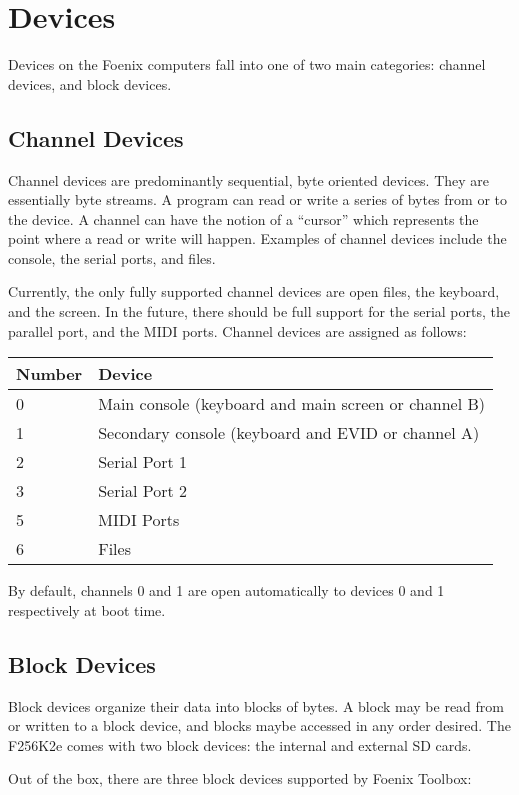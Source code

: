 \chapter{Devices}
Devices on the Foenix computers fall into one of two main categories: channel devices, and block devices.

\section*{Channel Devices}
Channel devices are predominantly sequential, byte oriented devices. They are essentially byte streams. A program can read or write a series of bytes from or to the device. A channel can have the notion of a ``cursor'' which represents the point where a read or write will happen. Examples of channel devices include the console, the serial ports, and files.

Currently, the only fully supported channel devices are open files, the keyboard, and the screen. In the future, there should be full support for the serial ports, the parallel port, and the MIDI ports. Channel devices are assigned as follows:

\begin{tabular}{|l||l|} \hline
	Number & Device \\ \hline\hline
	0 & Main console (keyboard and main screen or channel B) \\ \hline
	1 & Secondary console (keyboard and EVID or channel A) \\ \hline
	2 & Serial Port 1 \\ \hline
	3 & Serial Port 2 \\ \hline
	5 & MIDI Ports \\ \hline
	6 & Files \\ \hline
\end{tabular}

By default, channels 0 and 1 are open automatically to devices 0 and 1 respectively at boot time.

\section*{Block Devices}
Block devices organize their data into blocks of bytes. A block may be read from or written to a block device, and blocks maybe accessed in any order desired. The F256K2e comes with two block devices: the internal and external SD cards.

Out of the box, there are three block devices supported by Foenix Toolbox:


